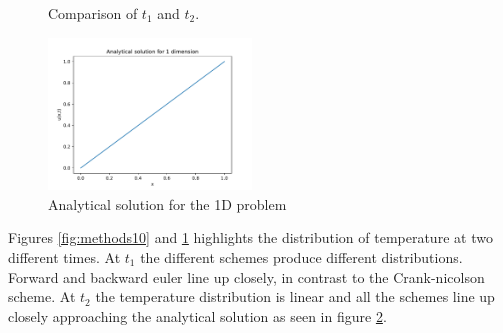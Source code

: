 \documentclass[10pt,a4paper]{article}
\begin{document}
\begin{figure}[H]
 	\centering
  	\caption{\label{fig:methods100}Comparison of $t_1$ and $t_2$.}
\end{figure}

\begin{figure} [H]
	\centering
	\includegraphics[width=0.48\textwidth]{../plots/1Danal.pdf}
	\caption{\label{fig:1Danal} Analytical solution for the 1D problem}
\end{figure}

\noindent Figures \ref{fig:methods10} and \ref{fig:methods100} highlights the distribution of temperature at two different times. At $t_1$ the different schemes produce different distributions. Forward and backward euler line up closely, in contrast to the Crank-nicolson scheme. At $t_2$ the temperature distribution is linear and all the schemes line up closely approaching the analytical solution as seen in figure \ref{fig:1Danal}.
\end{document}
